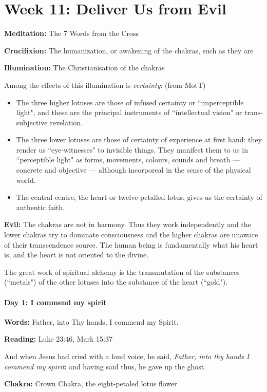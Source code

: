 \section{Week 11: Deliver Us from Evil}


\textbf{Meditation:} The 7 Words from the Cross

\textbf{Crucifixion:} The humanization, or awakening of the chakras, such as they are

\textbf{Illumination:} The Christianisation of the chakras


Among the effects of this illumination is \textit{certainty}: (from MotT)

\begin{itemize}
\item The three higher lotuses are those of infused certainty or ``imperceptible light", and these are the principal instruments of ``intellectual vision" or trans-subjective revelation. 
\item The three lower lotuses are those of certainty of experience at first hand: they render us ``eye-witnesses" to invisible things. They manifest them to us in ``perceptible light" as forms, movements, colours, sounds and breath — concrete and objective — although incorporeal in the sense of the physical world. 
\item The central centre, the heart or twelve-petalled lotus, gives us the certainty of authentic faith.
\end{itemize}

\textbf{Evil:} The chakras are not in harmony. Thus they work independently and the lower chakras try to dominate consciousness and the higher chakras are unaware of their transcendence source. The human being is fundamentally what his heart is, and the heart is not oriented to the divine. 


The great work of spiritual alchemy is the transmutation of the substances (``metals") of the other lotuses into the substance of the heart (``gold").


\paragraph{Day 1: I commend my spirit}

\textbf{Words:} Father, into Thy hands, I commend my Spirit.

\textbf{Reading:} Luke 23:46, Mark 15:37


\begin{quotex}
And when Jesus had cried with a loud voice, he said, \textit{Father, into thy hands I commend my spirit}: and having said thus, he gave up the ghost. 

\end{quotex}
\textbf{Chakra:} Crown Chakra, the eight-petaled lotus flower

